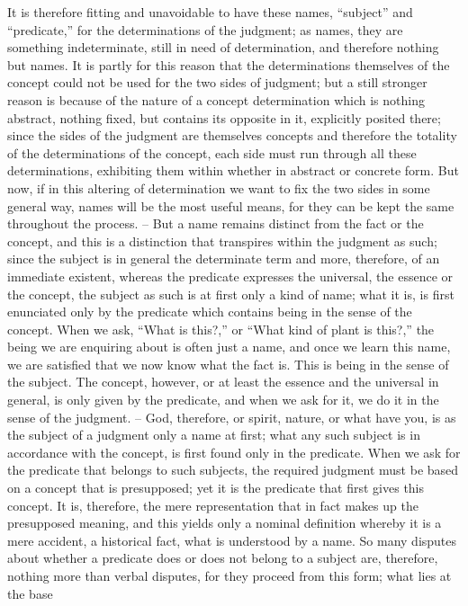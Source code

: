 It is therefore fitting and unavoidable to have these names, “subject”
and “predicate,” for the determinations of the judgment; as names, they
are something indeterminate, still in need of determination, and therefore
nothing but names. It is partly for this reason that the determinations
themselves of the concept could not be used for the two sides of judgment;
but a still stronger reason is because of the nature of a concept determination
which is nothing abstract, nothing fixed, but contains its opposite in it,
explicitly posited there; since the sides of the judgment are themselves
concepts and therefore the totality of the determinations of the concept,
each side must run through all these determinations, exhibiting them
within whether in abstract or concrete form. But now, if in this altering of
determination we want to fix the two sides in some general way, names will
be the most useful means, for they can be kept the same throughout the
process. – But a name remains distinct from the fact or the concept, and this
is a distinction that transpires within the judgment as such; since the subject
is in general the determinate term and more, therefore, of an immediate
existent, whereas the predicate expresses the universal, the essence or the
concept, the subject as such is at first only a kind of name; what it is, is first
enunciated only by the predicate which contains being in the sense of the
concept. When we ask, “What is this?,” or “What kind of plant is this?,”
the being we are enquiring about is often just a name, and once we learn
this name, we are satisfied that we now know what the fact is. This is being
in the sense of the subject. The concept, however, or at least the essence and
the universal in general, is only given by the predicate, and when we ask for
it, we do it in the sense of the judgment. – God, therefore, or spirit, nature,
or what have you, is as the subject of a judgment only a name at first; what
any such subject is in accordance with the concept, is first found only in
the predicate. When we ask for the predicate that belongs to such subjects,
the required judgment must be based on a concept that is presupposed; yet
it is the predicate that first gives this concept. It is, therefore, the mere
representation that in fact makes up the presupposed meaning, and this
yields only a nominal definition whereby it is a mere accident, a historical
fact, what is understood by a name. So many disputes about whether a
predicate does or does not belong to a subject are, therefore, nothing more
than verbal disputes, for they proceed from this form; what lies at the base
